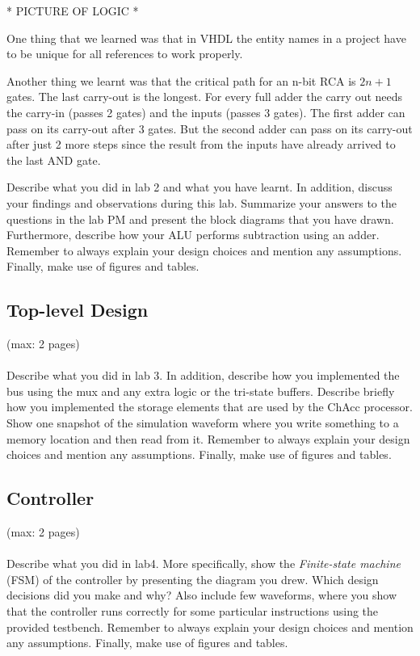 \documentclass[a4paper,11pt]{article}
\begin{document}
* PICTURE OF LOGIC *

One thing that we learned was that in VHDL the entity names in a project have to be unique for all references to work properly. 

Another thing we learnt was that the critical path for an n-bit RCA is $2n+1$ gates. The last carry-out is the longest. For every full adder the carry out needs the carry-in (passes 2 gates) and the inputs (passes 3 gates). The first adder can pass on its carry-out after 3 gates. But the second adder can pass on its carry-out after just 2 more steps since the result from the inputs have already arrived to the last AND gate.

Describe what you did in lab 2 and what you have learnt. In addition, discuss your findings and observations during this lab. Summarize your answers to the questions in the lab PM and present the block diagrams that you have drawn. Furthermore, describe how your ALU performs subtraction using an adder. Remember to always explain your design choices and mention any assumptions. Finally, make use of figures and tables. 

\subsection{Top-level Design}
(max: 2 pages)
\\\\
Describe what you did in lab 3. In addition, describe how you implemented the bus using the mux and any extra logic or the tri-state buffers. Describe briefly how you implemented the storage elements that are used by the ChAcc processor. Show one snapshot of the simulation waveform where you write something to a memory location and then read from it. Remember to always explain your design choices and mention any assumptions. Finally, make use of figures and tables. 

\subsection{Controller}
(max: 2 pages)
\\\\
Describe what you did in lab4. More specifically, show the \emph{Finite-state machine} (FSM) of the controller by presenting the diagram you drew. Which design decisions did you make and why? Also include few waveforms, where you show that the controller runs correctly for some particular instructions using the provided testbench. Remember to always explain your design choices and mention any assumptions. Finally, make use of figures and tables. 
\end{document}
